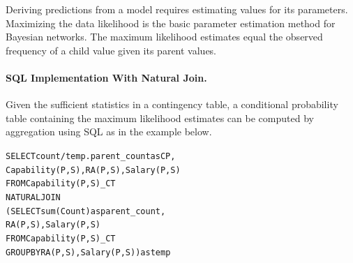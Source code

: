 Deriving predictions from a model requires estimating values for its parameters.  Maximizing the data likelihood is the basic parameter estimation method for Bayesian networks. The maximum likelihood estimates equal the observed frequency of a child value given its parent values.

\paragraph{SQL Implementation With Natural Join.} Given the sufficient statistics in a contingency table, a conditional probability table containing the maximum likelihood estimates can be computed by aggregation using SQL as in the example below. 

\begin{alltt}
SELECT count/temp.parent\_count as CP, 
Capability(P,S), RA(P,S), Salary(P,S) 
FROM Capability(P,S)\_CT 
NATURAL JOIN  
(SELECT sum(Count) as parent\_count, 
RA(P,S), Salary(P,S) 
FROM Capability(P,S)\_CT  
GROUP BY  RA(P,S), Salary(P,S) ) as temp
\end{alltt}


%
%


